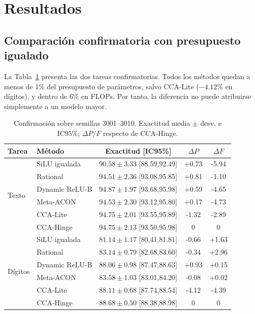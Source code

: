 \documentclass[runningheads]{llncs}
\begin{document}
\section{Resultados}

\subsection{Comparación confirmatoria con presupuesto igualado}
La Tabla~\ref{tab:matched} presenta las dos tareas confirmatorias. Todos los métodos quedan a menos de $1\%$ del presupuesto de parámetros, salvo CCA-Lite ($-4.12\%$ en dígitos), y dentro de $6\%$ en FLOPs. Por tanto, la diferencia no puede atribuirse simplemente a un modelo mayor.

\begin{table}[t]
\centering
\caption{Confirmación sobre semillas 3001--3010. Exactitud media $\pm$ desv. e IC95\%; $\Delta P/F$ respecto de CCA-Hinge.}
\label{tab:matched}
\scriptsize
\begin{tabular}{@{}llccc@{}}
\toprule
Tarea & Método & Exactitud [IC95\%] & $\Delta P$ & $\Delta F$\\
\midrule
\multirow{6}{*}{Texto}
& SiLU igualada & $90.58{\pm}3.33$ [88.59,92.49] & +0.73 & -5.94\\
& Rational & $94.51{\pm}2.36$ [93.08,95.85] & +0.81 & -1.10\\
& Dynamic ReLU-B & $\mathbf{94.87{\pm}1.97}$ [93.68,95.98] & +0.59 & -4.65\\
& Meta-ACON & $94.53{\pm}2.30$ [93.12,95.80] & +0.17 & -4.73\\
& CCA-Lite & $94.75{\pm}2.01$ [93.55,95.89] & -1.32 & -2.89\\
& CCA-Hinge & $94.75{\pm}2.13$ [93.50,95.98] & 0 & 0\\
\midrule
\multirow{6}{*}{Dígitos}
& SiLU igualada & $81.14{\pm}1.17$ [80.41,81.81] & -0.66 & +1.63\\
& Rational & $83.14{\pm}0.79$ [82.68,83.60] & -0.34 & +2.96\\
& Dynamic ReLU-B & $88.06{\pm}0.98$ [87.47,88.63] & +0.93 & +0.15\\
& Meta-ACON & $83.58{\pm}1.03$ [83.01,84.20] & -0.08 & +0.02\\
& CCA-Lite & $88.11{\pm}0.68$ [87.74,88.54] & -4.12 & -4.39\\
& CCA-Hinge & $\mathbf{88.68{\pm}0.50}$ [88.38,88.98] & 0 & 0\\
\bottomrule
\end{tabular}
\end{table}
\end{document}
